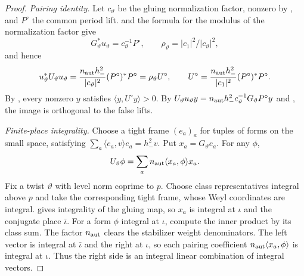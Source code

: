 \begin{proof}
\emph{Pairing identity.}
Let $c_\vartheta$ be the gluing normalization factor, nonzero by , and $P^\circ$ the common period lift.  and the formula for the modulus of the normalization factor give
\[
 G_\vartheta^*u_\vartheta=c_\vartheta^{-1}P^\circ,
 \qquad
 \rho_\vartheta=|c_1|^2/|c_\vartheta|^2 ,
\]
and hence
\[
 u_\vartheta^*U_\vartheta u_\vartheta
  =\frac{n_{\rm aut}h_-^2}{|c_\vartheta|^2}(P^\circ)^*P^\circ
  =\rho_\vartheta U^\circ,\qquad
 U^\circ=\frac{n_{\rm aut}h_-^2}{|c_1|^2}(P^\circ)^*P^\circ .
\]
By , every nonzero $y$ satisfies $\langle y,U^\circ y\rangle>0$. By $U_\vartheta u_\vartheta y=n_{\rm aut}h_-^2 c_\vartheta^{-1}G_\vartheta P^\circ y$ and , the image is orthogonal to the false lifts.

\emph{Finite-place integrality.}
Choose a tight frame $(e_a)_a$ for tuples of forms on the small space, satisfying $\sum_a\langle e_a,v\rangle e_a=h_-^2v$. Put $x_a=G_\vartheta e_a$. For any $\phi$,
\[
 U_\vartheta\phi=\sum_a n_{\rm aut}\langle x_a,\phi\rangle x_a .
\]
Fix a twist $\vartheta$ with level norm coprime to $p$. Choose class representatives integral above $p$ and take the corresponding tight frame, whose Weyl coordinates are integral.  gives integrality of the gluing map, so $x_a$ is integral at $\iota$ and the conjugate place $\bar\iota$. For a form $\phi$ integral at $\iota$, compute the inner product by its class sum. The factor $n_{\rm aut}$ clears the stabilizer weight denominators. The left vector is integral at $\bar\iota$ and the right at $\iota$, so each pairing coefficient $n_{\rm aut}\langle x_a,\phi\rangle$ is integral at $\iota$. Thus the right side is an integral linear combination of integral vectors.


\end{proof}
